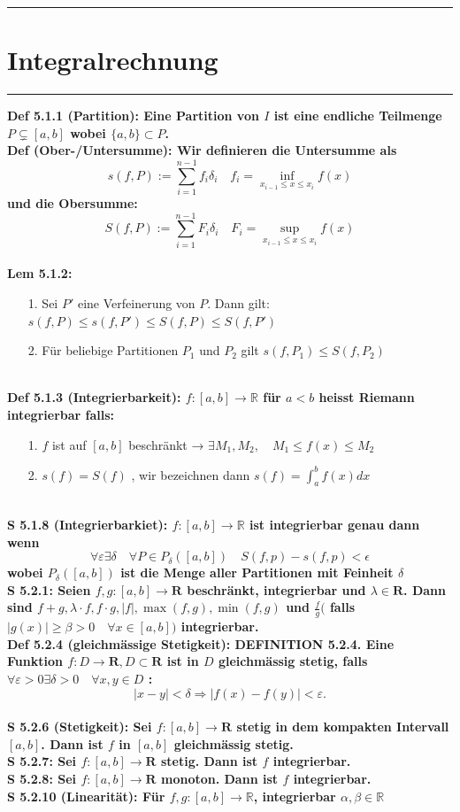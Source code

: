 \documentclass[7pt,landscape, margin = 0.1mm]{article}
\newcommand{\titellinie}{\rule{1.\linewidth}{0.75pt}}
\newcommand*{\mysection}[2][black]{\vskip 0pt \titellinie\vspace{-20pt}\section{#2}\vspace{-14pt}\titellinie \colorlet{chaptecolor}{#1}}
\newcommand{\DEF}[2]{\color{chaptercolor}\bf{Def #1}:\color{black}    \hspace{0.2cm} #2 \\}
\newcommand{\LEM}[2]{\color{chaptercolor}\bf{Lem #1}:\color{black}    \hspace{0.2cm} #2 \\}
\newcommand{\SA}[2]{\color{chaptercolor}\bf{S #1}:\color{black}    \hspace{0.2cm} #2 \\}
\begin{document}
\begin{multicols}{4}
\begin{flushleft}
\mysection[magenta]{\centering Integralrechnung}
\DEF{5.1.1 (Partition)}{Eine Partition von $I$ ist eine endliche Teilmenge $P \subsetneq [a,b]$ wobei $\{a,b\} \subset P$.}
\DEF{ (Ober-/Untersumme)}{Wir definieren die Untersumme als
$$ s(f,P) := \sum_{i=1}^{n-1}f_i\delta_i \quad f_i = \inf_{x_{i-1}\leq x \leq x_i} f(x) $$
und die Obersumme:
$$ S(f,P) := \sum_{i=1}^{n-1}F_i\delta_i \quad F_i = \sup_{x_{i-1}\leq x \leq x_i} f(x) $$}
\LEM{5.1.2}{\begin{itemize}
\item[1.] Sei $P'$ eine Verfeinerung von $P$. Dann gilt: $s(f,P) \leq s(f,P') \leq S(f,P) \leq S(f,P')$ 
\item[2.] Für beliebige Partitionen $P_1$ und $P_2$ gilt $s(f,P_1) \leq S(f,P_2)$
\end{itemize}}
\DEF{5.1.3 (Integrierbarkeit)}{$f:[a,b] \longrightarrow \mathbb{R}$ für $a<b$ heisst Riemann integrierbar falls:
\begin{itemize}
\item[1.] $f$ ist auf $[a,b]$ beschränkt → $\exists M_1, M_2, \quad M_1 \leq f(x) \leq M_2$
\item[2.] $s(f) = S(f)$ , wir bezeichnen dann $s(f) = \int_a^b f(x)dx$\end{itemize} }
\SA{5.1.8 (Integrierbarkiet)}{$ f:[a,b] \longrightarrow \mathbb{R}$ ist integrierbar genau dann wenn $$\forall \varepsilon \exists \delta \quad \forall P \in P_{\delta} \left( [a,b]\right) \quad S(f,p) - s(f,p) < \epsilon  $$
wobei $P_{\delta} \left([a,b] \right)$ ist die Menge aller Partitionen mit Feinheit $\delta$}
\SA{5.2.1}{Seien $f, g:[a, b] \longrightarrow \mathbf{R}$ beschränkt, integrierbar und $\lambda \in \mathbf{R}$. Dann sind $f+g, \lambda \cdot f, f \cdot g,|f|, \max (f, g), \min (f, g)$ und $\frac{f}{g}($ falls $|g(x)| \geqslant \beta>0 \quad \forall x \in[a, b])$ integrierbar.}
\DEF{5.2.4 (gleichmässige Stetigkeit)}{DEFINITION 5.2.4. Eine Funktion $f: D \longrightarrow \mathbf{R}, D \subset \mathbf{R}$ ist in $D$ gleichmässig stetig, falls $\forall \varepsilon>0 \exists \delta>0 \quad \forall x, y \in D$ :
$$
|x-y|<\delta \Longrightarrow|f(x)-f(y)|<\varepsilon .
$$}
\SA{5.2.6 (Stetigkeit)}{Sei $f: [a,b] \longrightarrow \mathbf{R}$ stetig in dem kompakten Intervall $[a,b]$. Dann ist $f$ in $[a,b]$ gleichmässig stetig.}
\SA{5.2.7}{Sei $f:[a,b] \longrightarrow \mathbf{R}$ stetig. Dann ist $f$ integrierbar.}
\SA{5.2.8}{Sei $f:[a,b] \longrightarrow \mathbf{R}$ monoton. Dann ist $f$ integrierbar.}
\SA{5.2.10 (Linearität)}{Für $f,g:[a,b] \longrightarrow \mathbb{R}$, integrierbar $\alpha,\beta\in \mathbb{R}$
}
\end{flushleft}
\end{multicols}
\end{document}
